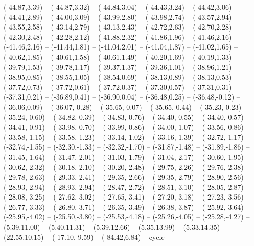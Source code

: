{  (-44.87,3.39) -- (-44.87,3.32) -- (-44.84,3.04) -- (-44.43,3.24) -- (-44.42,3.06) -- (-44.41,2.89) -- (-44.00,3.09) --
  (-43.99,2.80) -- (-43.98,2.74) -- (-43.57,2.94) -- (-43.55,2.58) -- (-43.14,2.79) -- (-43.13,2.43) -- (-42.72,2.63) --
  (-42.70,2.28) -- (-42.30,2.48) -- (-42.28,2.12) -- (-41.88,2.32) -- (-41.86,1.96) -- (-41.46,2.16) -- (-41.46,2.16) --
  (-41.44,1.81) -- (-41.04,2.01) -- (-41.04,1.87) -- (-41.02,1.65) -- (-40.62,1.85) -- (-40.61,1.58) -- (-40.61,1.49) --
  (-40.20,1.69) -- (-40.19,1.33) -- (-39.79,1.53) -- (-39.78,1.17) -- (-39.37,1.37) -- (-39.36,1.01) -- (-38.96,1.21) --
  (-38.95,0.85) -- (-38.55,1.05) -- (-38.54,0.69) -- (-38.13,0.89) -- (-38.13,0.53) -- (-37.72,0.73) -- (-37.72,0.61) --
  (-37.72,0.37) -- (-37.30,0.57) -- (-37.31,0.31) -- (-37.31,0.21) -- (-36.89,0.41) -- (-36.90,0.04) -- (-36.48,0.25) --
  (-36.48,-0.12) -- (-36.06,0.09) -- (-36.07,-0.28) -- (-35.65,-0.07) -- (-35.65,-0.44) -- (-35.23,-0.23) -- (-35.24,-0.60) --
  (-34.82,-0.39) -- (-34.83,-0.76) -- (-34.40,-0.55) -- (-34.40,-0.57) -- (-34.41,-0.91) -- (-33.98,-0.70) -- (-33.99,-0.86) --
  (-34.00,-1.07) -- (-33.56,-0.86) -- (-33.58,-1.15) -- (-33.58,-1.23) -- (-33.14,-1.02) -- (-33.16,-1.39) -- (-32.72,-1.17) --
  (-32.74,-1.55) -- (-32.30,-1.33) -- (-32.32,-1.70) -- (-31.87,-1.48) -- (-31.89,-1.86) -- (-31.45,-1.64) -- (-31.47,-2.01) --
  (-31.03,-1.79) -- (-31.04,-2.17) -- (-30.60,-1.95) -- (-30.62,-2.32) -- (-30.18,-2.10) -- (-30.20,-2.48) -- (-29.75,-2.26) --
  (-29.76,-2.38) -- (-29.78,-2.63) -- (-29.33,-2.41) -- (-29.35,-2.66) -- (-29.35,-2.79) -- (-28.90,-2.56) -- (-28.93,-2.94) --
  (-28.93,-2.94) -- (-28.47,-2.72) -- (-28.51,-3.10) -- (-28.05,-2.87) -- (-28.08,-3.25) -- (-27.62,-3.02) -- (-27.65,-3.41) --
  (-27.20,-3.18) -- (-27.23,-3.56) -- (-26.77,-3.33) -- (-26.80,-3.71) -- (-26.35,-3.49) -- (-26.38,-3.87) -- (-25.92,-3.64) --
  (-25.95,-4.02) -- (-25.50,-3.80) -- (-25.53,-4.18) -- (-25.26,-4.05) -- (-25.28,-4.27) -- (5.39,11.00) -- (5.40,11.31) --
  (5.39,12.66) -- (5.35,13.99) -- (5.33,14.35) -- (22.55,10.15) -- (-17.10,-9.59) -- (-84.42,6.84) -- cycle}
\def\Awall{(-86.60,-9.88) -- (-86.60,29.56) -- (-56.15,44.72) -- (-56.15,5.28) -- cycle}
\def\AwFB{(-86.60,-9.88)}
\def\AwFT{(-86.60,29.56)}
\def\AwBT{(-56.15,44.72)}
\def\AwBB{(-56.15,5.28)}
\def\AqFL{(-82.10,7.10)}
\def\AqFR{(-17.19,-8.75)}
\def\AqBR{(20.24,9.89)}
\def\AqBL{(-44.67,25.73)}
